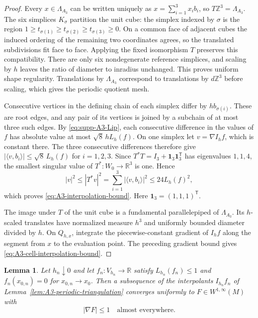 \documentclass[11pt]{article}
\newtheorem{lemma}[lemma]{Lemma}
\theoremstyle{definition}
\theoremstyle{remark}
\theoremstyle{definition}
\theoremstyle{remark}
\newcommand{\R}{\mathbb R}
\newcommand{\one}{\mathbf 1}
\begin{document}
\begin{proof}
Every $x\in\Lambda_{A_3}$ can be written uniquely as
$x=\sum_{i=1}^3x_i b_i$, so $T\mathbb Z^3=\Lambda_{A_3}$.
The six simplices $K_\sigma$ partition the unit cube: the simplex indexed
by $\sigma$ is the region
$1\ge t_{\sigma(1)}\ge t_{\sigma(2)}\ge t_{\sigma(3)}\ge0$.
On a common face of adjacent cubes the induced ordering of the remaining
two coordinates agrees, so the translated subdivisions fit face to face.
Applying the fixed isomorphism $T$ preserves this compatibility.  There
are only six nondegenerate reference simplices, and scaling by $h$ leaves
the ratio of diameter to inradius unchanged.  This proves uniform shape
regularity.  Translations by $\Lambda_{A_3}$ correspond to translations
by $d\mathbb Z^3$ before scaling, which gives the periodic quotient mesh.

Consecutive vertices in the defining chain of each simplex differ by
$h b_{\sigma(i)}$.  These are root edges, and any pair of its vertices
is joined by a subchain of at most three such edges.  By
\eqref{eq:supp-A3-Lip}, each consecutive difference in the values of $f$
has absolute value at most $\sqrt8\,hL_h(f)$.  On one simplex let
$v=\nabla I_h f$, which is constant there.  The three consecutive
differences therefore give
$|\langle v,b_i\rangle|\le\sqrt8\,L_h(f)$ for $i=1,2,3$.
Since $T^*T=I_3+\one_3\one_3^{\mathsf T}$ has eigenvalues $1,1,4$,
the smallest singular value of $T^*:W_0\to\mathbb R^3$ is one.  Hence
\[
 |v|^2\le|T^*v|^2
 =\sum_{i=1}^3|\langle v,b_i\rangle|^2\le24L_h(f)^2,
\]
which proves \eqref{eq:A3-interpolation-bound}.
Here $\one_3=(1,1,1)^{\mathsf T}$.

The image under $T$ of the unit cube is a fundamental parallelepiped of
$\Lambda_{A_3}$.  Its $h$-scaled translates have normalized measure $h^3$
and uniformly bounded diameter divided by $h$.  On $Q_{h,x}$, integrate
the piecewise-constant gradient of $I_h f$ along the segment from $x$ to
the evaluation point.  The preceding gradient bound gives
\eqref{eq:A3-cell-interpolation-bound}.
\end{proof}

\begin{lemma}
\label{lem:supp-A3-compactness}
Let $h_n\downarrow0$ and let $f_n:V_{h_n}\to\R$ satisfy
$L_{h_n}(f_n)\le1$ and $f_n(x_{0,n})=0$ for $x_{0,n}\to x_0$.  Then a
subsequence of the interpolants $I_{h_n}f_n$ of
Lemma~\ref{lem:A3-periodic-triangulation} converges uniformly to
$F\in W^{1,\infty}(M)$ with
\begin{equation}
 |\nabla F|\le1
 \quad\text{almost everywhere}.
 \label{eq:supp-A3-limit-Lip}
\end{equation}
\end{lemma}
\end{document}
